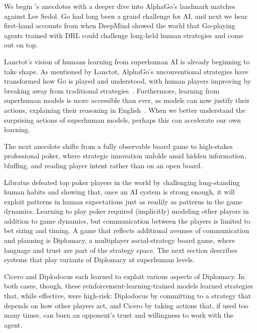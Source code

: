 \documentclass[10pt]{article}
\def\citep#1{}%
\begin{document}
We begin 's anecdotes with a deeper dive into AlphaGo's landmark matches against Lee Sedol.
Go had long been a grand challenge for AI, and next we hear first-hand accounts from when DeepMind showed the world that Go-playing agents trained with DRL could challenge long-held human strategies and come out on top.



Lanctot's vision of humans learning from superhuman AI is already beginning to take shape. 
As mentioned by Lanctot, AlphaGo's unconventional strategies have transformed how Go is played and understood, with human players improving by breaking away from traditional strategies~\citep{Shin2023Go}. 
Furthermore, learning from superhuman models is more accessible than ever, as models can now justify their actions, explaining their reasoning in English~\citep{ma2026mixingexpertknowledgebring}.
When we better understand the surprising actions of superhuman models, perhaps this can accelerate our own learning.

The next anecdote shifts from a fully observable board game to high-stakes professional poker, where strategic innovation unfolds amid hidden information, bluffing, and reading player intent rather than on an open board. 



Libratus defeated top poker players in the world by challenging long-standing human habits and showing that, once an AI system is strong enough, it will exploit patterns in human expectations just as readily as patterns in the game dynamics.
Learning to play poker required (implicitly) modeling other players in addition to game dynamics, but communication between the players is limited to bet sizing and timing. 
A game that reflects additional avenues of communication and planning is Diplomacy, a multiplayer social-strategy board game, where language and trust are part of the strategy space. The next section describes systems that play variants of Diplomacy at superhuman levels.




Cicero and Diplodocus each learned to exploit various aspects of Diplomacy.
In both cases, though, these reinforcement-learning-trained models
learned strategies that, while effective, were high-risk: Diplodocus by committing to a strategy that depends on how other players act, and Cicero by taking actions that, if used too many times, can burn an opponent's trust and willingness to work with the agent. 
\end{document}
